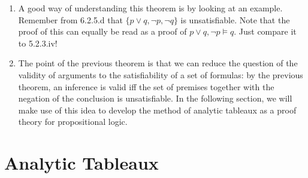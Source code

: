 \begin{enumerate}[\thesection.1]
\begin{proof}
\begin{itemize}
				\item ($2.\Rightarrow 1.$) Suppose (for conditional proof) that $\Gamma\cup\{\neg\phi\}$ is unsatisfiable, i.e. there exists no valuation $v$ such that $\llbracket \psi\rrbracket_v=1$ for all $\psi\in \Gamma\cup\{\neg\phi\}$. We want to show that $\Gamma\vDash\phi$ and do so indirectly. So, suppose that $\Gamma\nvDash\phi$; that is, suppose that there exists a valuation $v$ such that $\llbracket \psi\rrbracket_v=1$ for all $\psi\in \Gamma$ and $\llbracket \phi\rrbracket_v=0$. But then, since $\llbracket\neg\phi\rrbracket_v=1-\llbracket\phi\rrbracket$, it follows that $\llbracket\neg\phi\rrbracket_v=1$. And this just means that $\llbracket \psi\rrbracket_v=1$ for all $\psi\in \Gamma\cup\{\neg\phi\}$---in contradiction to  $\Gamma\cup\{\neg\phi\}$ being unsatisfiable. Hence $\Gamma\vDash\phi$, as desired.
			
			\end{itemize}
			\end{proof}
		
	  \item A good way of understanding this theorem is by looking at an example.
			Remember from 6.2.5.d that $\{p\lor q, \neg p, \neg q\}$ is unsatisfiable.
			Note that the proof of this can equally be read as a proof of $p\lor q,\neg p\vDash q$.
			Just compare it to 5.2.3.iv!
		
	\item The point of the previous theorem is that we can reduce the question of the validity of arguments to the satisfiability of a set of formulas: by the previous theorem, an inference is valid iff the set of premises together with the negation of the conclusion is unsatisfiable. In the following section, we will make use of this idea to develop the method of analytic tableaux as a proof theory for propositional logic.
		
	\end{enumerate}

\section{Analytic Tableaux}
			
